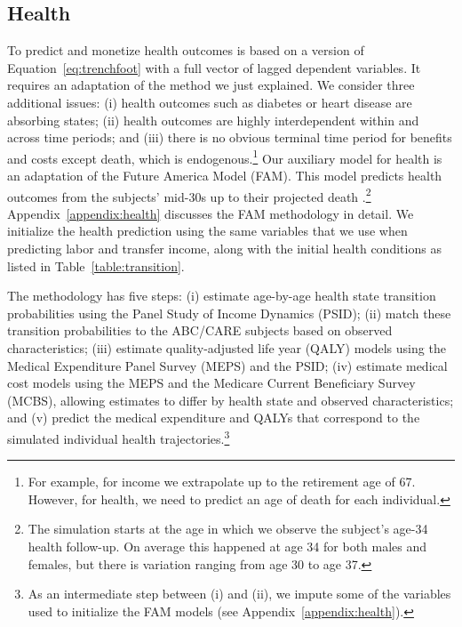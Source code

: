\subsection{Health} \label{section:health}

To predict and monetize health outcomes is based on a version of Equation~\eqref{eq:trenchfoot} with a full vector of lagged dependent variables. It requires an adaptation of the method we just explained. We consider three additional issues: (i) health outcomes such as diabetes or heart disease are absorbing states; (ii) health outcomes are highly interdependent within and across time periods; and (iii) there is no obvious terminal time period for benefits and costs except death, which is endogenous.\footnote{For example, for income we extrapolate up to the retirement age of 67. However, for health, we need to predict an age of death for each individual.} Our auxiliary model for health is an adaptation of the Future America Model (FAM). This model predicts health outcomes from the subjects' mid-30s up to their projected death \citep{Goldman_etal_2015_Future-Elderly-Model-Report}.\footnote{The simulation starts at the age in which we observe the subject's age-34 health follow-up. On average this happened at age 34 for both males and females, but there is variation ranging from age 30 to age 37.} Appendix~\ref{appendix:health} discusses the FAM methodology in detail. We initialize the health prediction using the same variables that we use when predicting labor and transfer income, along with the initial health conditions as listed in Table~\ref{table:transition}.

The methodology has five steps: (i) estimate age-by-age health state transition probabilities using the Panel Study of Income Dynamics (PSID); (ii) match these transition probabilities to the ABC/CARE subjects based on observed characteristics; (iii) estimate quality-adjusted life year (QALY) models using the Medical Expenditure Panel Survey (MEPS) and the PSID; (iv) estimate medical cost models using the MEPS and the Medicare Current Beneficiary Survey (MCBS), allowing estimates to differ by health state and observed characteristics; and (v) predict the medical expenditure and QALYs that correspond to the simulated individual health trajectories.\footnote{As an intermediate step between (i) and (ii), we impute some of the variables used to initialize the FAM models (see Appendix~\ref{appendix:health}).}

